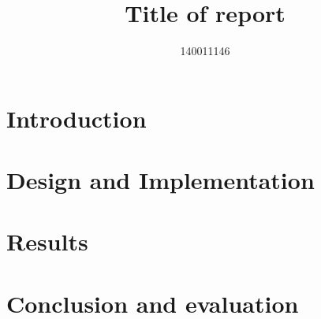 \documentclass{article}
\title{Title of report}
\author{140011146}
\begin{document}




\section{Introduction}

\section{Design and Implementation}

\section{Results}

\section{Conclusion and evaluation}

\end{document}
